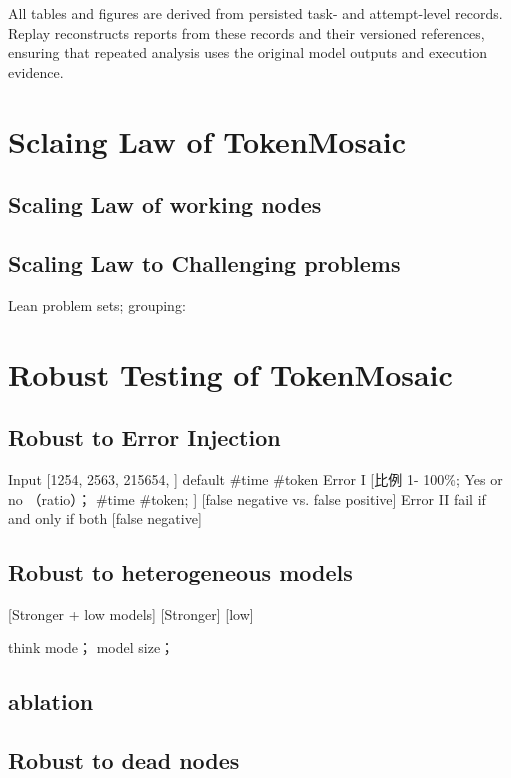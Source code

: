 \documentclass{article}
\theoremstyle{plain}
\begin{document}
All tables and figures are derived from persisted task- and attempt-level
records. Replay reconstructs reports from these records and their
versioned references, ensuring that repeated analysis uses the original
model outputs and execution evidence.

\section{Sclaing Law of TokenMosaic}

\subsection{Scaling Law of working nodes}


\subsection{Scaling Law to Challenging problems}

Lean problem sets; grouping:

\section{Robust Testing of TokenMosaic}



\subsection{Robust to Error Injection}
Input
[1254, 2563, 215654, ]
default #time #token
Error I  [比例 1- 100\%;  Yes or no （ratio）； #time #token;  ] [false negative vs. false positive]
Error II  
fail if and only if both [false negative]


\subsection{Robust to heterogeneous  models}
[Stronger + low models]
[Stronger]
[low]

think mode； model size；


\subsection{ablation}


\subsection{Robust to dead nodes}
\end{document}
